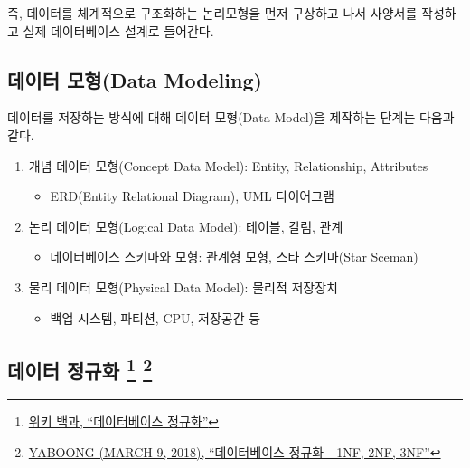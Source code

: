 \documentclass[
  letterpaper,
  chapter,a4paper,showtrims,openright,hidelinks]{oblivoir}
\providecommand{\tightlist}{%
  \setlength{\itemsep}{0pt}\setlength{\parskip}{0pt}}\usepackage{longtable,booktabs,array}
\begin{document}
즉, 데이터를 체계적으로 구조화하는 논리모형을 먼저 구상하고 나서
사양서를 작성하고 실제 데이터베이스 설계로 들어간다.

\hypertarget{db-design-in-practice}{%
\subsection{데이터 모형(Data Modeling)}\label{db-design-in-practice}}

데이터를 저장하는 방식에 대해 데이터 모형(Data Model)을 제작하는 단계는
다음과 같다.

\begin{enumerate}
\def\labelenumi{\arabic{enumi}.}
\tightlist
\item
  개념 데이터 모형(Concept Data Model): Entity, Relationship, Attributes

  \begin{itemize}
  \tightlist
  \item
    ERD(Entity Relational Diagram), UML 다이어그램
  \end{itemize}
\item
  논리 데이터 모형(Logical Data Model): 테이블, 칼럼, 관계

  \begin{itemize}
  \tightlist
  \item
    데이터베이스 스키마와 모형: 관계형 모형, 스타 스키마(Star Sceman)
  \end{itemize}
\item
  물리 데이터 모형(Physical Data Model): 물리적 저장장치

  \begin{itemize}
  \tightlist
  \item
    백업 시스템, 파티션, CPU, 저장공간 등
  \end{itemize}
\end{enumerate}

\hypertarget{data-normalization}{%
\subsection[데이터 정규화 ]{\texorpdfstring{데이터 정규화 \footnote{\href{https://ko.wikipedia.org/wiki/\%EB\%8D\%B0\%EC\%9D\%B4\%ED\%84\%B0\%EB\%B2\%A0\%EC\%9D\%B4\%EC\%8A\%A4_\%EC\%A0\%95\%EA\%B7\%9C\%ED\%99\%94}{위키
  백과, ``데이터베이스 정규화''}}
\footnote{\href{https://yaboong.github.io/database/2018/03/09/database-normalization-1/}{YABOONG
  (MARCH 9, 2018), ``데이터베이스 정규화 - 1NF, 2NF, 3NF''}}}{데이터 정규화  }}\label{data-normalization}}
\end{document}
